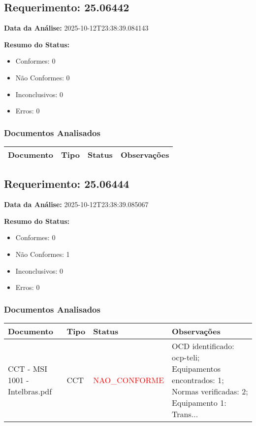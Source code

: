 \documentclass[12pt,a4paper]{article}
\begin{document}
\subsection{Requerimento: 25.06442}

\textbf{Data da Análise:} 2025-10-12T23:38:39.084143

\textbf{Resumo do Status:}
\begin{itemize}
    \item Conformes: 0
    \item Não Conformes: 0
    \item Inconclusivos: 0
    \item Erros: 0
\end{itemize}

\subsubsection{Documentos Analisados}

\begin{longtable}{|p{4cm}|p{2cm}|p{2cm}|p{6cm}|}
\hline
\textbf{Documento} & \textbf{Tipo} & \textbf{Status} & \textbf{Observações} \\
\hline
\endhead
\end{longtable}


\subsection{Requerimento: 25.06444}

\textbf{Data da Análise:} 2025-10-12T23:38:39.085067

\textbf{Resumo do Status:}
\begin{itemize}
    \item Conformes: 0
    \item Não Conformes: 1
    \item Inconclusivos: 0
    \item Erros: 0
\end{itemize}

\subsubsection{Documentos Analisados}

\begin{longtable}{|p{4cm}|p{2cm}|p{2cm}|p{6cm}|}
\hline
\textbf{Documento} & \textbf{Tipo} & \textbf{Status} & \textbf{Observações} \\
\hline
\endhead
CCT - MSI 1001 - Intelbras.pdf & CCT & \textcolor{red}{NAO\_CONFORME} & OCD identificado: ocp-teli; Equipamentos encontrados: 1; Normas verificadas: 2; Equipamento 1: Trans... \\
\hline
\end{longtable}
\end{document}
